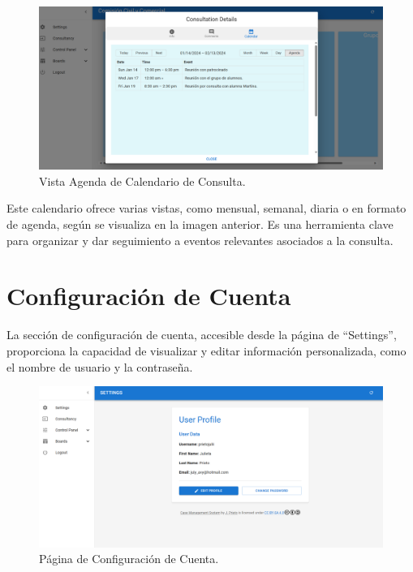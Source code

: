 \begin{figure}[H]
    \centering
    \includegraphics[width=1\linewidth]{fig/consulta-calendar-3.png}
    \caption{Vista Agenda de Calendario de Consulta.}
    \label{fig:consulta-calendar-3}
\end{figure}

Este calendario ofrece varias vistas, como mensual, semanal, diaria o en formato de agenda, según se visualiza en la imagen anterior. Es una herramienta clave para organizar y dar seguimiento a eventos relevantes asociados a la consulta.

\section{Configuración de Cuenta}\label{sec:configuracion-cuenta}

La sección de configuración de cuenta, accesible desde la página de ``Settings'', proporciona la capacidad de visualizar y editar información personalizada, como el nombre de usuario y la contraseña.

\begin{figure}[H]
    \centering
    \includegraphics[width=1\linewidth]{fig/settings-real-page.png}
    \caption{Página de Configuración de Cuenta.}
    \label{fig:settings-page}
\end{figure}
